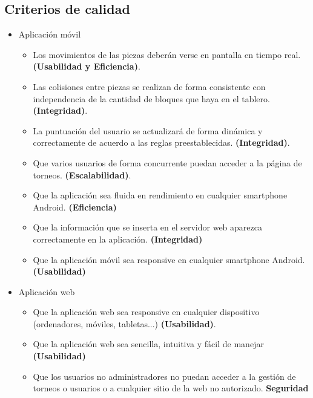 \documentclass{article}
\begin{document}
\subsection{Criterios de calidad} 
\begin{itemize}
  \item Aplicación móvil
  \begin{itemize}
    \item Los movimientos de las piezas deberán verse en pantalla en tiempo real. \textbf{(Usabilidad y Eficiencia)}.

    \item Las colisiones entre piezas se realizan de forma consistente con independencia de la cantidad de bloques que haya en el tablero. \textbf{(Integridad)}.

    \item La puntuación del usuario se actualizará de forma dinámica y correctamente de acuerdo a las reglas preestablecidas. \textbf{(Integridad)}.
    
    \item Que varios usuarios de forma concurrente puedan acceder a la página de torneos. \textbf{(Escalabilidad)}.

    \item Que la aplicación sea fluida en rendimiento en cualquier smartphone Android. \textbf{(Eficiencia)}
    
    \item Que la información que se inserta en el servidor web aparezca correctamente en la aplicación. \textbf{(Integridad)}
   
    \item Que la aplicación móvil sea responsive en cualquier smartphone Android. \textbf{(Usabilidad)}
  \end{itemize}
  \item Aplicación web
  \begin{itemize}
    \item Que la aplicación web sea responsive en cualquier dispositivo (ordenadores, móviles, tabletas...) \textbf{(Usabilidad)}.

    \item Que la aplicación web sea sencilla, intuitiva y fácil de manejar \textbf{(Usabilidad)}

    \item Que los usuarios no administradores no puedan acceder a la gestión de torneos o usuarios o a cualquier sitio de la web no autorizado. \textbf{Seguridad}


\end{itemize}
\end{itemize}
\end{document}
